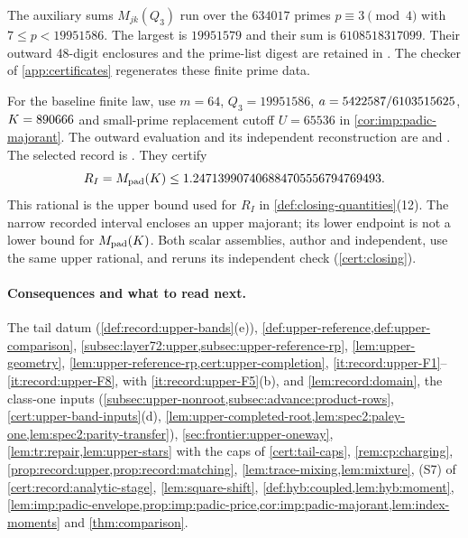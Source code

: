 \begin{certificate}\label{cert:index-moment}
The auxiliary sums $M_{jk}(Q_3)$ run over the $634017$ primes
$p\equiv3\pmod4$ with $7\le p<19951586$. The largest is $19951579$
and their sum is $6108518317099$. Their outward 48-digit enclosures
and the prime-list digest are retained in
.
The checker of \cref{app:certificates} regenerates these finite prime data.

For the baseline finite law, use $m=64$, $Q_3=19951586$,
$a=5422587/6103515625$, $K=890666$ and small-prime replacement cutoff
$U=65536$ in \cref{cor:imp:padic-majorant}. The outward evaluation
and its independent reconstruction are
 and
.
The selected record is
.
They certify
\[
 R_I=M_{\rm pad}(K)\le
 1.247139907406884705556794769493.
\]
This rational is the upper bound used for $R_I$ in \cref{def:closing-quantities}(12). The narrow recorded interval encloses an upper majorant;
its lower endpoint is not a lower bound for $M_{\rm pad}(K)$.
Both scalar assemblies, author and independent, use the same upper rational,
and  reruns its independent
check (\cref{cert:closing}).
\end{certificate}

\paragraph{Consequences and what to read next.}
The tail datum (\cref{def:record:upper-bands}(e)),
\cref{def:upper-reference,def:upper-comparison},
\cref{subsec:layer72:upper,subsec:upper-reference-rp}, \cref{lem:upper-geometry},
\cref{lem:upper-reference-rp,cert:upper-completion},
\ref{it:record:upper-F1}--\ref{it:record:upper-F8}, with
\ref{it:record:upper-F5}(b), and \cref{lem:record:domain}, the class-one
inputs (\cref{subsec:upper-nonroot,subsec:advance:product-rows},
\cref{cert:upper-band-inputs}(d),
\cref{lem:upper-completed-root,lem:spec2:paley-one,lem:spec2:parity-transfer}),
\cref{sec:frontier:upper-oneway}, \cref{lem:tr:repair,lem:upper-stars} with
the caps of \cref{cert:tail-caps}, \cref{rem:cp:charging},
\cref{prop:record:upper,prop:record:matching},
\cref{lem:trace-mixing,lem:mixture}, (S7) of \cref{cert:record:analytic-stage},
\cref{lem:square-shift}, \cref{def:hyb:coupled,lem:hyb:moment},
\cref{lem:imp:padic-envelope,prop:imp:padic-price,cor:imp:padic-majorant,lem:index-moments}
and \cref{thm:comparison}.

